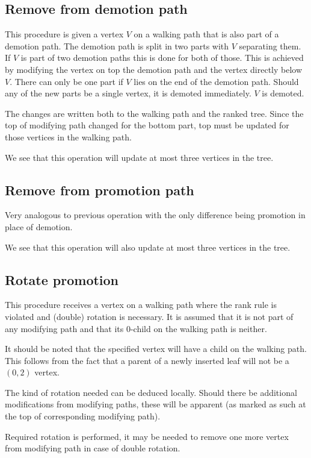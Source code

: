 \subsection{Remove from demotion path}

This procedure is given a vertex $V$ on a walking path that is also part of a demotion path. The demotion path is split in two parts with $V$ separating them. If $V$ is part of two demotion paths this is done for both of those. This is achieved by modifying the vertex on top the demotion path and the vertex directly below $V$. There can only be one part if $V$ lies on the end of the demotion path. Should any of the new parts be a single vertex, it is demoted immediately. $V$ is demoted.

The changes are written both to the walking path and the ranked tree. Since the top of modifying path changed for the bottom part, top must be updated for those vertices in the walking path.

We see that this operation will update at most three vertices in the tree.

\subsection{Remove from promotion path}

Very analogous to previous operation with the only difference being promotion in place of demotion.

We see that this operation will also update at most three vertices in the tree.

\subsection{Rotate promotion}

This procedure receives a vertex on a walking path where the rank rule is violated and (double) rotation is necessary. It is assumed that it is not part of any modifying path and that its $0$-child on the walking path is neither. 

It should be noted that the specified vertex will have a child on the walking path. This follows from the fact that a parent of a newly inserted leaf will not be a $(0,2)$ vertex.

The kind of rotation needed can be deduced locally. Should there be additional modifications from modifying paths, these will be apparent (as marked as such at the top of corresponding modifying path). 

Required rotation is performed, it may be needed to remove one more vertex from modifying path in case of double rotation.

